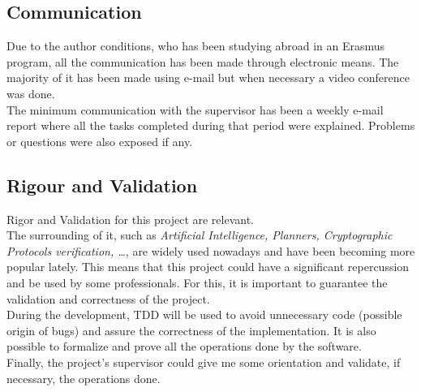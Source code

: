 \subsection{Communication}
Due to the author conditions, who has been studying abroad in an Erasmus program, all the communication has been made through electronic means. The majority of it has been made using e-mail but when necessary a video conference was done. \\
The minimum communication with the supervisor has been a weekly e-mail report where all the tasks completed during that period were explained. Problems or questions were also exposed if any.

\subsection{Rigour and Validation}
Rigor and Validation for this project are relevant. \\
The surrounding of it, such as \emph{Artificial Intelligence, Planners, Cryptographic Protocols verification, \ldots}, are widely used nowadays and have been becoming more popular lately. This means that this project could have a significant repercussion and be used by some professionals. For this, it is important to guarantee the validation and correctness of the project. \\
During the development, TDD will be used to avoid unnecessary code (possible origin of bugs) and assure the correctness of the implementation. It is also possible to formalize and prove all the operations done by the software.\\
Finally, the project's supervisor could give me some orientation and validate, if necessary, the operations done.